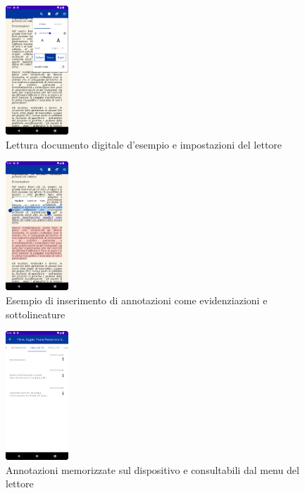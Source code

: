 \begin{multicols}{3}
            \begin{figure}[H]
                \includegraphics[width=0.21\textwidth]{img/reader_settings.png}
                \caption{Lettura documento digitale d'esempio e impostazioni del lettore}
                \label{readersettings}
            \end{figure}
            
            \begin{figure}[H]
                \includegraphics[width=0.21\textwidth]{img/annotations.png}
                \caption{Esempio di inserimento di annotazioni come evidenziazioni e sottolineature}
                \label{annotations}
            \end{figure}
            
            \begin{figure}[H]
                \includegraphics[width=0.21\textwidth]{img/annotation2.png}
                \caption{Annotazioni memorizzate sul dispositivo e consultabili dal menu del lettore}
                \label{annotation2}
            \end{figure}


\end{multicols}
